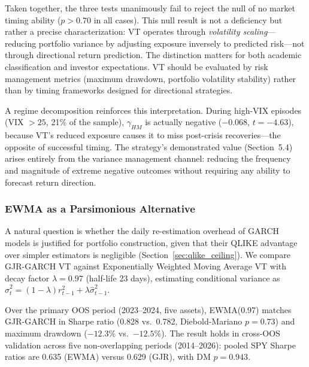 Taken together, the three tests unanimously fail to reject the null of no market timing ability ($p > 0.70$ in all cases). This null result is not a deficiency but rather a precise characterization: VT operates through \textit{volatility scaling}---reducing portfolio variance by adjusting exposure inversely to predicted risk---not through directional return prediction. The distinction matters for both academic classification and investor expectations. VT should be evaluated by risk management metrics (maximum drawdown, portfolio volatility stability) rather than by timing frameworks designed for directional strategies.

A regime decomposition reinforces this interpretation. During high-VIX episodes (VIX $> 25$, 21\% of the sample), $\gamma_{HM}$ is actually negative ($-0.068$, $t = -4.63$), because VT's reduced exposure causes it to miss post-crisis recoveries---the opposite of successful timing. The strategy's demonstrated value (Section~5.4) arises entirely from the variance management channel: reducing the frequency and magnitude of extreme negative outcomes without requiring any ability to forecast return direction.



\subsubsection{EWMA as a Parsimonious Alternative}
\label{sec:ewma_vt}

A natural question is whether the daily re-estimation overhead of GARCH models is justified for portfolio construction, given that their QLIKE advantage over simpler estimators is negligible (Section~\ref{sec:qlike_ceiling}). We compare GJR-GARCH VT against Exponentially Weighted Moving Average VT with decay factor $\lambda = 0.97$ (half-life 23 days), estimating conditional variance as $\hat{\sigma}^2_t = (1 - \lambda) r^2_{t-1} + \lambda \hat{\sigma}^2_{t-1}$.

Over the primary OOS period (2023--2024, five assets), EWMA(0.97) matches GJR-GARCH in Sharpe ratio (0.828 vs.\ 0.782, Diebold-Mariano $p = 0.73$) and maximum drawdown ($-12.3\%$ vs.\ $-12.5\%$). The result holds in cross-OOS validation across five non-overlapping periods (2014--2026): pooled SPY Sharpe ratios are 0.635 (EWMA) versus 0.629 (GJR), with DM $p = 0.943$.

